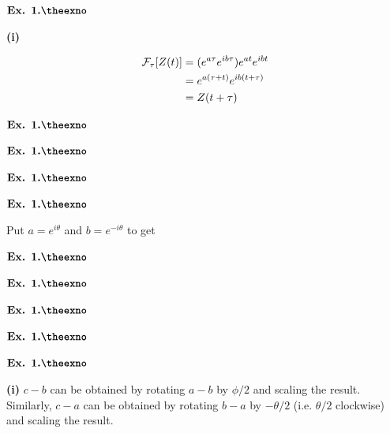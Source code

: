 \documentclass{article}
\def\tf{\textbf}
\def\mc{\ensuremath\mathcal}
\newcounter{exno}
\begin{document}
${\textbf{Ex. 1.\theexno}}$
\addtocounter{exno}{1}

\tf{(i)}

\begin{align*}
    \mc{F}_{\tau}[Z(t)] &= (e^{a\tau}e^{ib\tau})e^{at}e^{ibt}\\
    &= e^{a(\tau+t)}e^{ib(t+\tau)}\\
    &= Z(t+\tau)
\end{align*}

\vspace{0.2in}

${\textbf{Ex. 1.\theexno}}$
\addtocounter{exno}{1}

\vspace{0.2in}

${\textbf{Ex. 1.\theexno}}$
\addtocounter{exno}{1}

\vspace{0.2in}

${\textbf{Ex. 1.\theexno}}$
\addtocounter{exno}{1}

\vspace{0.2in}

${\textbf{Ex. 1.\theexno}}$
\addtocounter{exno}{1}

Put $a=e^{i\theta}$ and $b=e^{-i\theta}$ to get

\vspace{0.2in}

${\textbf{Ex. 1.\theexno}}$
\addtocounter{exno}{1}

\vspace{0.2in}

${\textbf{Ex. 1.\theexno}}$
\addtocounter{exno}{1}

\vspace{0.2in}

${\textbf{Ex. 1.\theexno}}$
\addtocounter{exno}{1}

\vspace{0.2in}

${\textbf{Ex. 1.\theexno}}$
\addtocounter{exno}{1}

\vspace{0.2in}

${\textbf{Ex. 1.\theexno}}$
\addtocounter{exno}{1}

\tf{(i)} $c-b$ can be obtained by rotating $a-b$ by $\phi/2$ and scaling the result. Similarly, $c-a$ can be obtained by rotating $b-a$ by $-\theta/2$ (i.e. $\theta/2$ clockwise) and scaling the result.\\~\\
\end{document}
